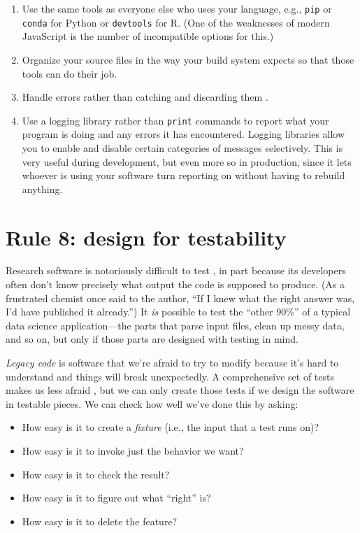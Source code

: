 \documentclass[10pt,letterpaper]{article}
\begin{document}
\begin{enumerate}

\item
  Use the same tools as everyone else who uses your language,
  e.g., \texttt{pip} or \texttt{conda} for Python or \texttt{devtools} for R.
  (One of the weaknesses of modern JavaScript is the number of incompatible options for this.)

\item
  Organize your source files in the way your build system expects
  so that those tools can do their job.

\item
  Handle errors rather than catching and discarding them \cite{Nakshatri2016}.

\item
  Use a logging library rather than \texttt{print} commands
  to report what your program is doing and any errors it has encountered.
  Logging libraries allow you to enable and disable certain categories of messages selectively.
  This is very useful during development,
  but even more so in production,
  since it lets whoever is using your software turn reporting on
  without having to rebuild anything.

\end{enumerate}

\section*{Rule 8: design for testability}

Research software is notoriously difficult to test \cite{Hook2009,Kanewala2014},
in part because its developers often don't know precisely what output the code is supposed to produce.
(As a frustrated chemist once said to the author,
``If I knew what the right answer was, I'd have published it already.'')
It \emph{is} possible to test the ``other 90\%'' of a typical data science application---the parts that
parse input files,
clean up messy data,
and so on,
but only if those parts are designed with testing in mind.

\emph{Legacy code} is software that we're afraid to try to modify
because it's hard to understand and things will break unexpectedly.
A comprehensive set of tests makes us less afraid \cite{Feathers2004},
but we can only create those tests if we design the software in testable pieces.
We can check how well we've done this by asking:

\begin{itemize}
\item
  How easy is it to create a \emph{fixture}
  (i.e., the input that a test runs on)?
\item
  How easy is it to invoke just the behavior we want?
\item
  How easy is it to check the result?
\item
  How easy is it to figure out what ``right'' is?
\item
  How easy is it to delete the feature?
\end{itemize}
\end{document}
